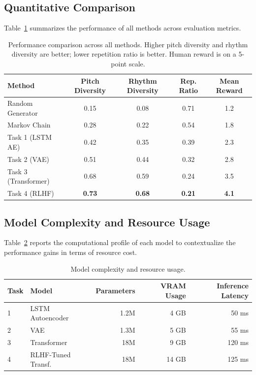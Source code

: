 \documentclass{article}
\begin{document}
\subsection{Quantitative Comparison}

Table~\ref{tab:main_results} summarizes the performance of all methods across evaluation metrics.

\begin{table}[h]
  \caption{Performance comparison across all methods. Higher pitch diversity and rhythm diversity are better; lower repetition ratio is better. Human reward is on a 5-point scale.}
  \label{tab:main_results}
  \centering
  \begin{tabular}{lcccc}
    \toprule
    Method & Pitch Diversity & Rhythm Diversity & Rep. Ratio & Mean Reward \\
    \midrule
    Random Generator    & 0.15 & 0.08 & 0.71 & 1.2 \\
    Markov Chain        & 0.28 & 0.22 & 0.54 & 1.8 \\
    Task 1 (LSTM AE)    & 0.42 & 0.35 & 0.39 & 2.3 \\
    Task 2 (VAE)        & 0.51 & 0.44 & 0.32 & 2.8 \\
    Task 3 (Transformer)& 0.68 & 0.59 & 0.24 & 3.5 \\
    Task 4 (RLHF)       & \textbf{0.73} & \textbf{0.68} & \textbf{0.21} & \textbf{4.1} \\
    \bottomrule
  \end{tabular}
\end{table}

\subsection{Model Complexity and Resource Usage}

Table~\ref{tab:model_complexity} reports the computational profile of each model to contextualize the performance gains in terms of resource cost.

\begin{table}[h]
  \caption{Model complexity and resource usage.}
  \label{tab:model_complexity}
  \centering
  \begin{tabular}{llrrr}
    \toprule
    Task & Model & Parameters & VRAM Usage & Inference Latency \\
    \midrule
    1 & LSTM Autoencoder   & 1.2M  & 4 GB  & 50 ms \\
    2 & VAE                & 1.3M  & 5 GB  & 55 ms \\
    3 & Transformer        & 18M   & 9 GB  & 120 ms \\
    4 & RLHF-Tuned Transf. & 18M   & 14 GB & 125 ms \\
    \bottomrule
  \end{tabular}
\end{table}
\end{document}
